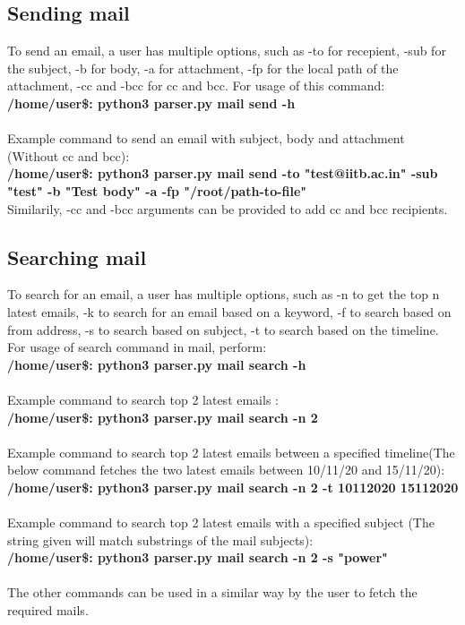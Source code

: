 \documentclass[12pt, letterpaper, twoside]{article}
\begin{document}
\subsection{Sending mail}
To send an email, a user has multiple options, such as -to for recepient, -sub for the subject, -b for body, -a for attachment, -fp for the local path of the attachment, -cc and -bcc for cc and bcc. For usage of this command: \\
\textbf{/home/user\$: python3 parser.py mail send -h}\\
\\
Example command to send an email with subject, body and attachment (Without cc and bcc):\\
\textbf{/home/user\$: python3 parser.py mail send -to "test@iitb.ac.in" -sub "test" -b "Test body" -a -fp "/root/path-to-file"}\\
Similarily, -cc and -bcc arguments can be provided to add cc and bcc recipients.

\subsection{Searching mail}
To search for an email, a user has multiple options, such as -n to get the top n latest emails, -k to search for an email based on a keyword, -f to search based on from address, -s to search based on subject, -t to search based on the timeline.
For usage of search command in mail, perform:\\
\textbf{/home/user\$: python3 parser.py mail search -h}\\
\\
Example command to search top 2 latest emails :\\
\textbf{/home/user\$: python3 parser.py mail search -n 2}\\
\\
Example command to search top 2 latest emails between a specified timeline(The below command fetches the two latest emails between 10/11/20 and 15/11/20):\\
\textbf{/home/user\$: python3 parser.py mail search -n 2 -t 10112020 15112020}\\
\\
Example command to search top 2 latest emails with a specified subject (The string given will match substrings of the mail subjects):\\
\textbf{/home/user\$: python3 parser.py mail search -n 2 -s "power"}\\
\\
The other commands can be used in a similar way by the user to fetch the required mails.
\end{document}
